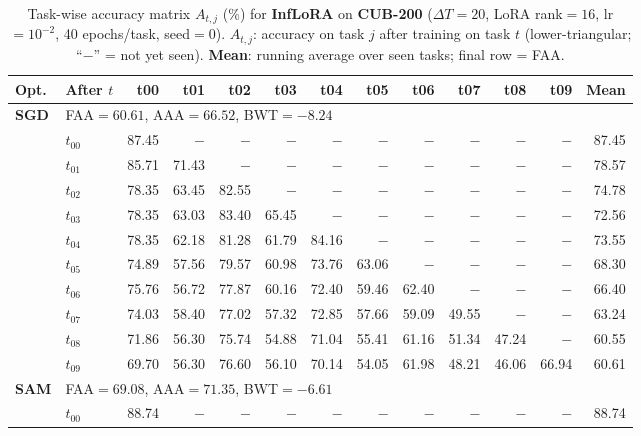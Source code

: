 \begin{table}[ht]
\centering
\caption{%
  Task-wise accuracy matrix $A_{t,j}$ (\%) for \textbf{InfLoRA} on \textbf{CUB-200} ($\Delta T=20$, LoRA rank$=16$, lr$=10^{-2}$, 40 epochs/task, seed$=0$).
  $A_{t,j}$: accuracy on task $j$ after training on task $t$  (lower-triangular; ``$-$'' = not yet seen).
  \textbf{Mean}: running average over seen tasks; final row = FAA.
}
\label{tab:raw_inflora_cub200}
\setlength{\tabcolsep}{2.8pt}
\renewcommand{\arraystretch}{0.88}
\scriptsize
\begin{tabular}{@{}l l r r r r r r r r r r r@{}}
\toprule
\textbf{Opt.} & \textbf{After $t$} & \textbf{t00} & \textbf{t01} & \textbf{t02} & \textbf{t03} & \textbf{t04} & \textbf{t05} & \textbf{t06} & \textbf{t07} & \textbf{t08} & \textbf{t09} & \textbf{Mean} \\
\midrule
\multirow{11}{*}{\textbf{SGD}} & \multicolumn{12}{l}{\quad\small FAA$=60.61$,\; AAA$=66.52$,\; BWT$=-8.24$} \\
 & $t_{00}$ & 87.45 & $-$ & $-$ & $-$ & $-$ & $-$ & $-$ & $-$ & $-$ & $-$ & 87.45 \\
 & $t_{01}$ & 85.71 & 71.43 & $-$ & $-$ & $-$ & $-$ & $-$ & $-$ & $-$ & $-$ & 78.57 \\
 & $t_{02}$ & 78.35 & 63.45 & 82.55 & $-$ & $-$ & $-$ & $-$ & $-$ & $-$ & $-$ & 74.78 \\
 & $t_{03}$ & 78.35 & 63.03 & 83.40 & 65.45 & $-$ & $-$ & $-$ & $-$ & $-$ & $-$ & 72.56 \\
 & $t_{04}$ & 78.35 & 62.18 & 81.28 & 61.79 & 84.16 & $-$ & $-$ & $-$ & $-$ & $-$ & 73.55 \\
 & $t_{05}$ & 74.89 & 57.56 & 79.57 & 60.98 & 73.76 & 63.06 & $-$ & $-$ & $-$ & $-$ & 68.30 \\
 & $t_{06}$ & 75.76 & 56.72 & 77.87 & 60.16 & 72.40 & 59.46 & 62.40 & $-$ & $-$ & $-$ & 66.40 \\
 & $t_{07}$ & 74.03 & 58.40 & 77.02 & 57.32 & 72.85 & 57.66 & 59.09 & 49.55 & $-$ & $-$ & 63.24 \\
 & $t_{08}$ & 71.86 & 56.30 & 75.74 & 54.88 & 71.04 & 55.41 & 61.16 & 51.34 & 47.24 & $-$ & 60.55 \\
 & $t_{09}$ & 69.70 & 56.30 & 76.60 & 56.10 & 70.14 & 54.05 & 61.98 & 48.21 & 46.06 & 66.94 & 60.61 \\
\midrule
\multirow{11}{*}{\textbf{SAM}} & \multicolumn{12}{l}{\quad\small FAA$=69.08$,\; AAA$=71.35$,\; BWT$=-6.61$} \\
 & $t_{00}$ & 88.74 & $-$ & $-$ & $-$ & $-$ & $-$ & $-$ & $-$ & $-$ & $-$ & 88.74 \\

\end{tabular}
\end{table}
